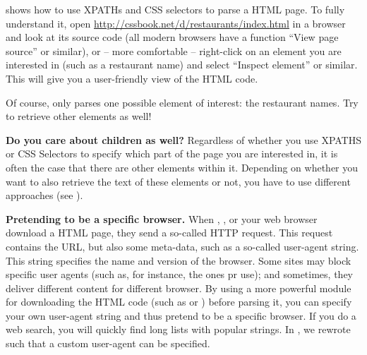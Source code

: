  shows how to use XPATHs and CSS selectors to parse
a HTML page. To fully understand it, open
\url{http://cssbook.net/d/restaurants/index.html} in a browser and
look at its source code (all modern browsers have a function ``View
page source'' or similar), or -- more comfortable -- right-click on an
element you are interested in (such as a restaurant name) and select
``Inspect element'' or similar. This will give you a user-friendly
view of the HTML code.



Of course,  only parses one possible element of interest: the restaurant names. Try to retrieve other elements as well!

\begin{feature}\textbf{Do you care about children as well?}
Regardless of whether you use XPATHS or CSS Selectors to specify which part of the page you are interested in, it is often the case that there are other elements within it. Depending on whether you want to also retrieve the text of these elements or not, you have to use different approaches (see ).
\end{feature}




\begin{feature}\textbf{Pretending to be a specific browser.}  When , , or your web browser download a HTML page, they send a so-called HTTP request. This request contains the URL, but also some meta-data, such as a so-called user-agent string. This string specifies the name and version of the browser. Some sites may block specific user agents (such as, for instance, the ones  pr  use); and sometimes, they deliver different content for different browser. By using a more powerful module for downloading the HTML code (such as  or ) before parsing it, you can specify your own user-agent string and thus pretend to be a specific browser. If you do a web search, you will quickly find long lists with popular strings. In , we rewrote  such that a custom user-agent can be specified. 
\end{feature}

